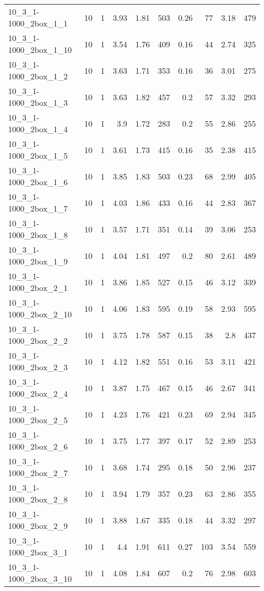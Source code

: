 \begin{center}
\begin{scriptsize}
\begin{longtable}{lrrrrrrrrr}
10\_3\_1-1000\_2box\_1\_1 & 10 & 1 & 3.93 & 1.81 & 503 & 0.26 & 77 & 3.18 & 479\\
10\_3\_1-1000\_2box\_1\_10 & 10 & 1 & 3.54 & 1.76 & 409 & 0.16 & 44 & 2.74 & 325\\
10\_3\_1-1000\_2box\_1\_2 & 10 & 1 & 3.63 & 1.71 & 353 & 0.16 & 36 & 3.01 & 275\\
10\_3\_1-1000\_2box\_1\_3 & 10 & 1 & 3.63 & 1.82 & 457 & 0.2 & 57 & 3.32 & 293\\
10\_3\_1-1000\_2box\_1\_4 & 10 & 1 & 3.9 & 1.72 & 283 & 0.2 & 55 & 2.86 & 255\\
10\_3\_1-1000\_2box\_1\_5 & 10 & 1 & 3.61 & 1.73 & 415 & 0.16 & 35 & 2.38 & 415\\
10\_3\_1-1000\_2box\_1\_6 & 10 & 1 & 3.85 & 1.83 & 503 & 0.23 & 68 & 2.99 & 405\\
10\_3\_1-1000\_2box\_1\_7 & 10 & 1 & 4.03 & 1.86 & 433 & 0.16 & 44 & 2.83 & 367\\
10\_3\_1-1000\_2box\_1\_8 & 10 & 1 & 3.57 & 1.71 & 351 & 0.14 & 39 & 3.06 & 253\\
10\_3\_1-1000\_2box\_1\_9 & 10 & 1 & 4.04 & 1.81 & 497 & 0.2 & 80 & 2.61 & 489\\
10\_3\_1-1000\_2box\_2\_1 & 10 & 1 & 3.86 & 1.85 & 527 & 0.15 & 46 & 3.12 & 339\\
10\_3\_1-1000\_2box\_2\_10 & 10 & 1 & 4.06 & 1.83 & 595 & 0.19 & 58 & 2.93 & 595\\
10\_3\_1-1000\_2box\_2\_2 & 10 & 1 & 3.75 & 1.78 & 587 & 0.15 & 38 & 2.8 & 437\\
10\_3\_1-1000\_2box\_2\_3 & 10 & 1 & 4.12 & 1.82 & 551 & 0.16 & 53 & 3.11 & 421\\
10\_3\_1-1000\_2box\_2\_4 & 10 & 1 & 3.87 & 1.75 & 467 & 0.15 & 46 & 2.67 & 341\\
10\_3\_1-1000\_2box\_2\_5 & 10 & 1 & 4.23 & 1.76 & 421 & 0.23 & 69 & 2.94 & 345\\
10\_3\_1-1000\_2box\_2\_6 & 10 & 1 & 3.75 & 1.77 & 397 & 0.17 & 52 & 2.89 & 253\\
10\_3\_1-1000\_2box\_2\_7 & 10 & 1 & 3.68 & 1.74 & 295 & 0.18 & 50 & 2.96 & 237\\
10\_3\_1-1000\_2box\_2\_8 & 10 & 1 & 3.94 & 1.79 & 357 & 0.23 & 63 & 2.86 & 355\\
10\_3\_1-1000\_2box\_2\_9 & 10 & 1 & 3.88 & 1.67 & 335 & 0.18 & 44 & 3.32 & 297\\
10\_3\_1-1000\_2box\_3\_1 & 10 & 1 & 4.4 & 1.91 & 611 & 0.27 & 103 & 3.54 & 559\\
10\_3\_1-1000\_2box\_3\_10 & 10 & 1 & 4.08 & 1.84 & 607 & 0.2 & 76 & 2.98 & 603\\

\end{longtable}
\end{scriptsize}
\end{center}

